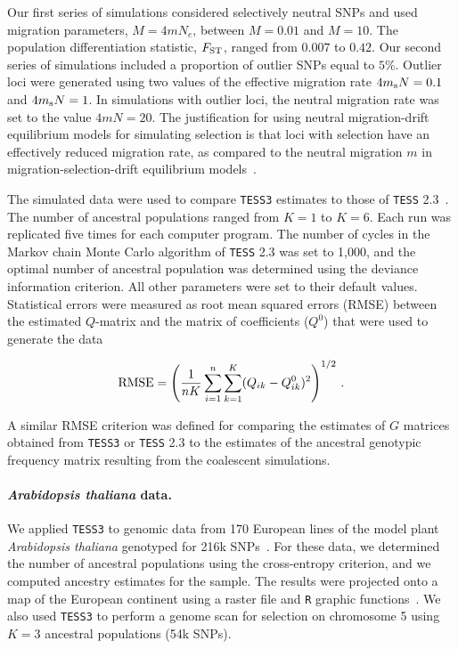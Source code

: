 Our first series of simulations considered selectively neutral SNPs and used migration parameters, $M = 4mN_{e}$, between $M = 0.01$ and $M = 10$. The population differentiation statistic, $F_{\rm ST}$, ranged from $0.007$ to $0.42$. Our second series of simulations included a proportion of outlier SNPs equal to $5\%$. Outlier loci were generated using two values of the effective migration rate $4m_{\rm s} N = 0.1$ and $4m_{\rm s} N = 1$. In simulations with outlier loci, the neutral migration rate was set to the value $4m N = 20$. The justification for using neutral migration-drift equilibrium models for simulating selection is that loci with selection have an effectively reduced migration rate, as compared to the neutral migration $m$ in migration-selection-drift equilibrium models~\citep{bazin2010likelihood}.

 
 The simulated data were used to compare {\tt TESS3} estimates to those of {\tt TESS} 2.3~\citep{durand2009spatial}. The number of ancestral populations ranged from $K=1$ to $K=6$.  Each run was replicated five times for each computer program.  The number of cycles in the Markov chain Monte Carlo algorithm of {\tt TESS} 2.3 was set to 1,000, and the optimal number of ancestral population was determined using the deviance information criterion. All other parameters were set to their default values. Statistical errors were measured as root mean squared errors (RMSE) between the estimated $Q$-matrix and the matrix of coefficients ($Q^0$) that were used to generate the data
   
$$
{\rm RMSE} =  \left(    \frac{1}{nK} \sum_{i =1}^n \sum_{k=1}^K   (Q_{ik} - Q_{ik}^{0})^2   \right)^{1/2} \, .
$$ 
   
\noindent A similar RMSE criterion was defined for comparing the estimates of $G$ matrices obtained from {\tt TESS3} or {\tt TESS} 2.3 to the estimates of the ancestral genotypic frequency matrix resulting from the coalescent simulations.


\paragraph{{\it Arabidopsis thaliana} data.} 


We applied {\tt TESS3} to genomic data from 170 European lines of the model plant {\it Arabidopsis thaliana} genotyped for 216k SNPs~\citep{atwell2010genome}. For these data, we determined the number of ancestral populations using the cross-entropy criterion, and we computed ancestry estimates for the sample. The results were projected onto a map of the European continent using a raster file and {\tt R} graphic functions~\citep{jay2012forecasting}.  We also used {\tt TESS3} to perform  a genome scan for selection on chromosome 5 using $K = 3$ ancestral populations (54k SNPs).



